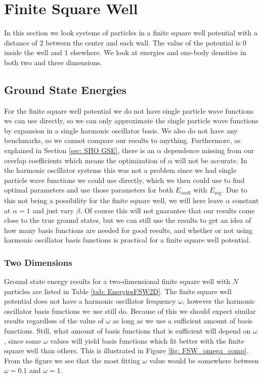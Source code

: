 \documentclass[../main.tex]{subfiles}
\begin{document}
\section{Finite Square Well}

In this section we look systems of particles in a finite square well potential with a distance of $2$ between the center and each wall. The value of the potential is $0$ inside the well and $1$ elsewhere. We look at energies and one-body densities in both two and three dimensions.

\subsection{Ground State Energies}

For the finite square well potential we do not have single particle wave functions we can use directly, so we can only approximate the single particle wave functions by expansion in a single harmonic oscillator basis. We also do not have any benchmarks, so we cannot compare our results to anything. Furthermore, as explained in Section \ref{sec: SHO GSE}, there is an $\alpha$ dependence missing from our overlap coefficients which means the optimization of $\alpha$ will not be accurate. In the harmonic oscillator systems this was not a problem since we had single particle wave functions we could use directly, which we then could use to find optimal parameters and use those parameters for both $E_\textrm{coeff}$ with $E_\textrm{reg}$. Due to this not being a possibility for the finite square well, we will here leave $\alpha$ constant at $\alpha = 1$ and just vary $\beta$. Of course this will not guarantee that our results come close to the true ground states, but we can still use the results to get an idea of how many basis functions are needed for good results, and whether or not using harmonic oscillator basis functions is practical for a finite square well potential.

\subsubsection{Two Dimensions}

Ground state energy results for a two-dimensional finite square well with $N$ particles are listed in Table \ref{tab: EnergiesFSW2D}. The finite square well potential does not have a harmonic oscillator frequency $\omega$, however the harmonic oscillator basis functions we use still do. Because of this we should expect similar results regardless of the value of $\omega$ as long as we use a sufficient amount of basis functions. Still, what amount of basis functions that is sufficient will depend on $\omega$, since some $\omega$ values will yield basis functions which fit better with the finite square well than others. This is illustrated in Figure \ref{fig: FSW_omega_comp}. From the figure we see that the most fitting $\omega$ value would be somewhere between $\omega = 0.1$ and $\omega = 1$.
\end{document}
